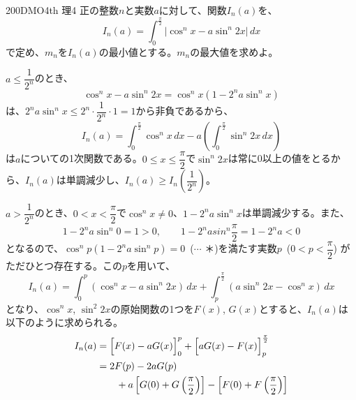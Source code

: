 \begin{thm}{200}{\maru}{DMO4th 理4}
 正の整数$n$と実数$a$に対して、関数$I_n(a)$を、
 \[ I_n(a)=\int_0^{\frac{\pi}{2}}\! \left|\cos^n x-a\sin^n2x\right| \,dx \]
 で定め、$m_n$を$I_n(a)$の最小値とする。$m_n$の最大値を求めよ。
\end{thm}

$a\le\dfrac{1}{2^n}$のとき、
\[ \cos^n x-a\sin^n 2x=\cos^n x\left(1-2^na\sin^n x\right) \]
は、$2^n a\sin^n x \le 2^n\cdot\dfrac{1}{2^n}\cdot 1=1$から非負であるから、
\[ I_n(a)=\int_0^{\frac{\pi}{2}}\! \cos^n x \,dx -a\left(\int_0^{\frac{\pi}{2}}\! \sin^n 2x \,dx\right) \]
は$a$についての1次関数である。$0\le x\le\dfrac{\pi}{2}$で$\sin^n 2x$は常に0以上の値をとるから、$I_n(a)$は単調減少し、$I_n(a)\ge I_n\left(\dfrac{1}{2^n}\right)$。

$a>\dfrac{1}{2^n}$のとき、$0<x<\dfrac{\pi}{2}$で$\cos^n x\neq 0$、$1-2^na\sin^n x$は単調減少する。また、
\[ 1-2^na\sin^n 0=1>0, \qquad 1-2^nasin^n\frac{\pi}{2}=1-2^na<0 \]
となるので、$\cos^n p(1-2^na\sin^n p)=0$~($\cdots$ ＊)を満たす実数$p$~($0<p<\dfrac{\pi}{2}$) がただひとつ存在する。この$p$を用いて、
\[ I_n(a)=\int_0^p\!(\cos^n x-a\sin^n 2x) \,dx+\int_p^{\frac{\pi}{2}}\!(a\sin^n 2x-\cos^n x) \,dx \]
となり、$\cos^n x$, $\sin^2 2x$の原始関数の1つを$F(x)$, $G(x)$とすると、$I_n(a)$は以下のように求められる。
\begin{align*}
 I_n(a)&=\Bigl[F(x)-aG(x)\Bigr]_0^p+\Bigl[aG(x)-F(x)\Bigr]_p^{\frac{\pi}{2}} \\
 &=2F(p)-2aG(p) \\
 &\qquad +a\left[G(0)+G\left(\frac{\pi}{2}\right)\right]-\left[F(0)+F\left(\frac{\pi}{2}\right)\right]
\end{align*}

